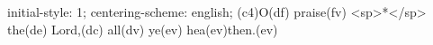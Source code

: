initial-style: 1;
centering-scheme: english;
(c4)O(df) praise(fv) <sp>*</sp> the(de) Lord,(dc) all(dv) ye(ev) hea(ev)then.(ev)